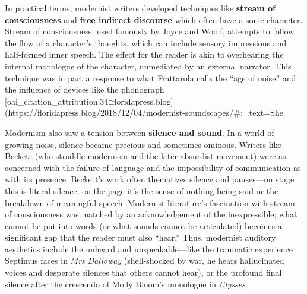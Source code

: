 \documentclass[12pt]{report}
\begin{document}
In practical terms, modernist writers developed techniques like \textbf{stream of consciousness} and \textbf{free indirect discourse} which often have a sonic character. Stream of consciousness, used famously by Joyce and Woolf, attempts to follow the flow of a character’s thoughts, which can include sensory impressions and half-formed inner speech. The effect for the reader is akin to overhearing the internal monologue of the character, unmediated by an external narrator. This technique was in part a response to what Frattarola calls the “age of noise” and the influence of devices like the phonograph [oai_citation_attribution:34‡floridapress.blog](https://floridapress.blog/2018/12/04/modernist-soundscapes/#:~:text=She%

Modernism also saw a tension between \textbf{silence and sound}. In a world of growing noise, silence became precious and sometimes ominous. Writers like Beckett (who straddle modernism and the later absurdist movement) were as concerned with the failure of language and the impossibility of communication as with its presence. Beckett’s work often thematizes silence and pauses—on stage this is literal silence; on the page it’s the sense of nothing being said or the breakdown of meaningful speech. Modernist literature’s fascination with stream of consciousness was matched by an acknowledgement of the inexpressible; what cannot be put into words (or what sounds cannot be articulated) becomes a significant gap that the reader must also “hear.” Thus, modernist auditory aesthetics include the unheard and unspeakable—like the traumatic experience Septimus faces in \textit{Mrs Dalloway} (shell-shocked by war, he hears hallucinated voices and desperate silences that others cannot hear), or the profound final silence after the crescendo of Molly Bloom’s monologue in \textit{Ulysses}.
\end{document}
